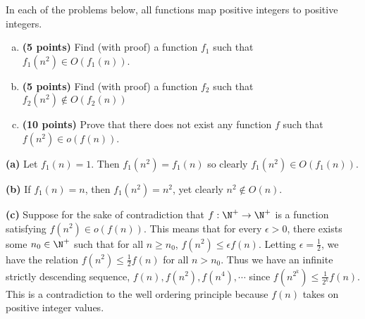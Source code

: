 \documentclass[11pt, letterpaper]{article}
\begin{document}
\pagebreak
\begin{problem}
    In each of the problems below, all functions map positive integers to positive integers.
    \begin{enumerate}[(a)]
        \item {\bf (5 points)} Find (with proof) a function $f_1$ such that $f_1(n^2) \in O(f_1(n))$.
        \item {\bf (5 points)} Find (with proof) a function $f_2$ such that $f_2(n^2) \not \in O(f_2(n))$
        \item {\bf (10 points)} Prove that there does not exist any function $f$ such that $f(n^2) \in o(f(n))$.   
    \end{enumerate}
\end{problem}

\begin{solution}
    \textbf{(a)} Let $f_1(n)=1$. Then $f_1(n^2)=f_1(n)$ so clearly $f_1(n^2)\in O(f_1(n))$.       
    
    \textbf{(b)} If $f_1(n)=n$, then $f_1(n^2)=n^2$, yet clearly $n^2\not\in O(n)$.    

    \textbf{(c)} Suppose for the sake of contradiction that $f : \N^+ \to \N^+$ is a function satisfying $f(n^2)\in o(f(n))$. This means that for every $\epsilon > 0$, there exists some $n_0\in \N^+$ such that for all $n \geq n_0$, $f(n^2)\leq \epsilon f(n)$. Letting $\epsilon=\frac{1}{2}$, we have the relation $f(n^2)\leq \frac{1}{2}f(n)$ for all $n>n_0$. Thus we have an infinite strictly descending sequence, $f(n), f(n^2), f(n^4),\cdots$ since $f(n^{2^k})\leq \frac{1}{2^{k}}f(n)$. This is a contradiction to the well ordering principle because $f(n)$ takes on positive integer values.
\end{solution}
\end{document}
